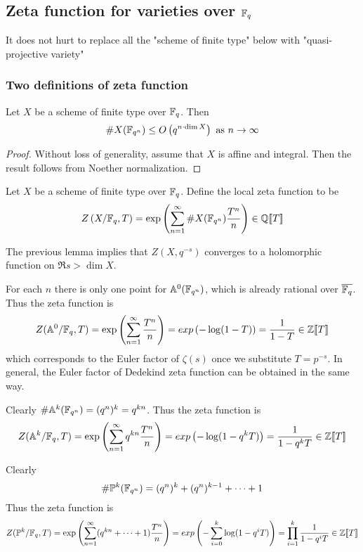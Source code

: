 \documentclass[letterpaper,11pt]{article}
\begin{document}
\subsection{Zeta function for varieties over $\mathbb{F}_q$}
It does not hurt to replace all the "scheme of finite type" below with "quasi-projective variety"
\subsubsection{Two definitions of zeta function}
\begin{lem}
Let $X$ be a scheme of finite type over $\mathbb{F}_q$. Then
\[
\#X(\mathbb{F}_{q^n}) \leq O\left(q^{n \cdot \dim X}\right) \text{ as $n \to \infty$}
\]
\end{lem}
\begin{proof}
Without loss of generality, assume that $X$ is affine and integral. Then the result follows from Noether normalization.
\end{proof}
\begin{defn}
Let $X$ be a scheme of finite type over $\mathbb{F}_q$. Define the local zeta function to be 
\[
Z\left(X/\mathbb{F}_q, T\right) = \exp\left(\sum_{n=1}^{\infty} \# X(\mathbb{F}_{q^n}) \frac{T^n}{n}\right) \in \mathbb{Q}[\![T]\!]
\]
\end{defn}
\begin{rem}
The previous lemma implies that $Z(X, q^{-s})$ converges to a holomorphic function on $\Re s > \dim X$.
\end{rem}
\begin{ex}[$\bA^0 = Spec(\FF_q)$]
For each $n$ there is only one point for $\mathbb{A}^0(\mathbb{F}_{q^n})$, which is already rational over $\overline{\mathbb{F}_q}$. Thus the zeta function is
\[
Z(\mathbb{A}^0/\mathbb{F}_q, T) = \exp\left(\sum_{n=1}^{\infty} \frac{T^n}{n}\right) = exp\left(-\log (1-T)\right) = \frac{1}{1-T} \in \mathbb{Z}[\![T]\!]
\]
which corresponds to the Euler factor of $\zeta(s)$ once we substitute $T = p^{-s}$. In general, the Euler factor of Dedekind zeta function can be obtained in the same way.
\end{ex}
\begin{ex}[{$\bA^k$}]
Clearly $\# \mathbb{A}^k(\mathbb{F}_{q^n}) = (q^n)^k = q^{kn}$. Thus the zeta function is
\[
Z(\mathbb{A}^k/\mathbb{F}_q, T) = \exp\left(\sum_{n=1}^{\infty} q^{kn}\frac{T^n}{n}\right) = exp\left(-\log (1-q^k T)\right) = \frac{1}{1-q^k T} \in \mathbb{Z}[\![T]\!]
\]
\end{ex}
\begin{ex}[$\PP^k$]
Clearly 
\[
\# \mathbb{P}^k (\mathbb{F}_{q^n}) = (q^n)^k + (q^n)^{k-1} + \cdots + 1
\]
Thus the zeta function is
\[
Z(\mathbb{P}^k/\mathbb{F}_q, T) = \exp\left(\sum_{n=1}^{\infty} (q^{kn} + \cdots + 1)\frac{T^n}{n}\right) = exp\left(- \sum_{i=0}^k \log (1-q^i T)\right) = \prod_{i=1}^k \frac{1}{1-q^i T} \in \mathbb{Z}[\![T]\!]
\]
\end{ex}
\end{document}
